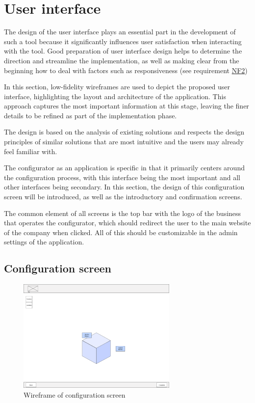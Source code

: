 \section{User interface}

The design of the user interface plays an essential part in the development of such a tool because it significantly influences user satisfaction when interacting with the tool. Good preparation of user interface design helps to determine the direction and streamline the implementation, as well as making clear from the beginning how to deal with factors such as responsiveness (see requirement \hyperref[itm:NF2]{NF2})

In this section, low-fidelity wireframes are used to depict the proposed user interface, highlighting the layout and architecture of the application. This approach captures the most important information at this stage, leaving the finer details to be refined as part of the implementation phase.

The design is based on the analysis of existing solutions and respects the design principles of similar solutions that are most intuitive and the users may already feel familiar with.

The configurator as an application is specific in that it primarily centers around the configuration process, with this interface being the most important and all other interfaces being secondary. In this section, the design of this configuration screen will be introduced, as well as the introductory and confirmation screens.

The common element of all screens is the top bar with the logo of the business that operates the configurator, which should redirect the user to the main website of the company when clicked. All of this should be customizable in the admin settings of the application.

\subsection{Configuration screen}

\begin{figure}[h]
\centering
\includegraphics[width=0.7\textwidth]{images/wireframe_configuration_default.png}
\caption{Wireframe of configuration screen}
\label{fig:wireframe-configuration}
\end{figure}

